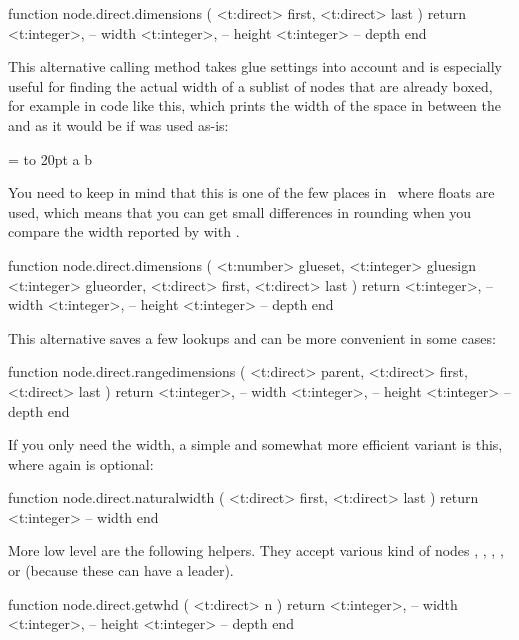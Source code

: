 \starttyping[option=LUA]
function node.direct.dimensions (
    <t:direct> first,
    <t:direct> last
)
    return
        <t:integer>, -- width
        <t:integer>, -- height
        <t:integer>  -- depth
end
\stoptyping

This alternative calling method takes glue settings into account and is
especially useful for finding the actual width of a sublist of nodes that are
already boxed, for example in code like this, which prints the width of the space
in between the  and  as it would be if  was used
as-is:

\starttyping
{} = \hbox to 20pt {a b}

\stoptyping

You need to keep in mind that this is one of the few places in \TEX\ where floats
are used, which means that you can get small differences in rounding when you
compare the width reported by  with .

\starttyping[option=LUA]
function node.direct.dimensions (
    <t:number>  glueset,
    <t:integer> gluesign
    <t:integer> glueorder,
    <t:direct>  first,
    <t:direct>  last
)
    return
        <t:integer>, -- width
        <t:integer>, -- height
        <t:integer>  -- depth
end
\stoptyping

This alternative saves a few lookups and can be more convenient in some
cases:

\starttyping[option=LUA]
function node.direct.rangedimensions (
    <t:direct> parent,
    <t:direct> first,
    <t:direct> last
)
    return
        <t:integer>, -- width
        <t:integer>, -- height
        <t:integer>  -- depth
end
\stoptyping

If you only need the width, a simple and somewhat more efficient variant is this,
where again  is optional:

\starttyping[option=LUA]
function node.direct.naturalwidth (
    <t:direct> first,
    <t:direct> last
)
    return <t:integer> -- width
end
\stoptyping

More low level are the following helpers. They accept various kind of nodes
, , , ,  or 
(because these can have a leader).

\starttyping[option=LUA]
function node.direct.getwhd ( <t:direct> n )
    return
        <t:integer>, -- width
        <t:integer>, -- height
        <t:integer>  -- depth
end
\stoptyping

